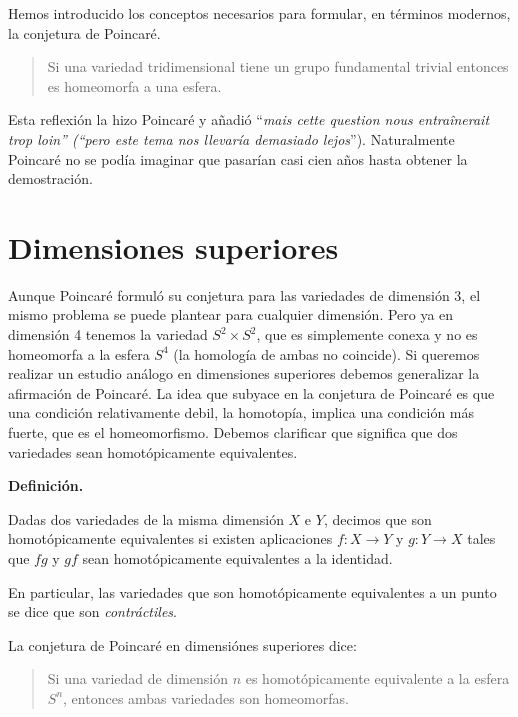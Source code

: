 \documentclass[a4paper, 12pt]{article}
\begin{document}
Hemos introducido los conceptos necesarios para formular, en términos modernos, la conjetura de Poincaré.

\begin{quote} \it

Si una variedad tridimensional tiene un grupo fundamental trivial entonces es homeomorfa a una esfera.

\end{quote}

Esta reflexión la hizo Poincaré y  añadió ``{\it mais cette question nous entraînerait trop loin'' (``pero este tema nos llevaría demasiado lejos}''). Naturalmente Poincaré no se podía imaginar que pasarían casi cien años hasta obtener la demostración.

\newpage

\section*{Dimensiones  superiores}


Aunque Poincaré formuló su conjetura para las variedades de dimensión 3, el mismo problema se puede plantear para cualquier dimensión. Pero ya en dimensión 4 tenemos la variedad $S^2\! \times \!S^2$, que es simplemente conexa y no es homeomorfa a la esfera $S^4$ (la homología de ambas no coincide).  Si queremos realizar un estudio análogo en dimensiones superiores debemos generalizar la afirmación de Poincaré.  La idea que subyace en la conjetura de Poincaré es que una condición relativamente debil, la homotopía, implica una condición más fuerte, que es el homeomorfismo.  Debemos clarificar que significa que dos variedades sean homotópicamente equivalentes.


\smallskip

{\bf Definición.} \begin{it}
Dadas dos variedades de la misma dimensión $X$ e $Y$, decimos que son homotópicamente equivalentes si existen aplicaciones $f: X \rightarrow Y$ y $g: Y \rightarrow X$ tales que $fg$ y $gf$ sean homotópicamente  equivalentes a la identidad.
\end{it}

\smallskip

En particular, las variedades que son  homotópicamente equivalentes a un punto se dice que son {\it contráctiles}.


La conjetura de Poincaré en dimensiónes superiores dice:

\begin{quote}\it

Si una variedad de dimensión $n$ es homotópicamente equivalente a la esfera $S^n$, entonces ambas variedades son homeomorfas.

\end{quote}
\end{document}

